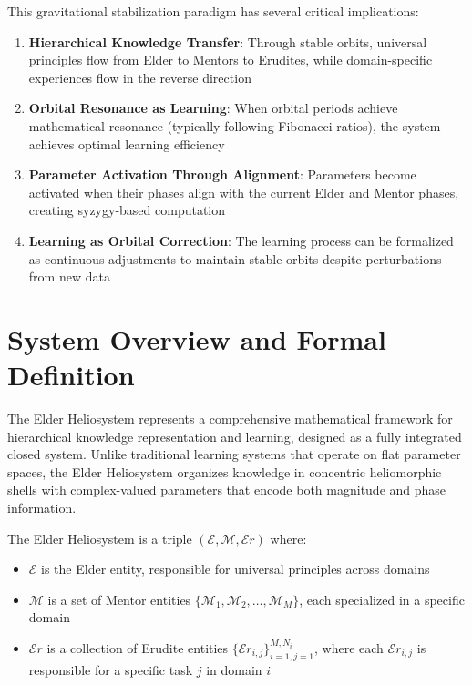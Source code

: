 This gravitational stabilization paradigm has several critical implications:

\begin{enumerate}
    \item \textbf{Hierarchical Knowledge Transfer}: Through stable orbits, universal principles flow from Elder to Mentors to Erudites, while domain-specific experiences flow in the reverse direction
    
    \item \textbf{Orbital Resonance as Learning}: When orbital periods achieve mathematical resonance (typically following Fibonacci ratios), the system achieves optimal learning efficiency
    
    \item \textbf{Parameter Activation Through Alignment}: Parameters become activated when their phases align with the current Elder and Mentor phases, creating syzygy-based computation
    
    \item \textbf{Learning as Orbital Correction}: The learning process can be formalized as continuous adjustments to maintain stable orbits despite perturbations from new data
\end{enumerate}

\section{System Overview and Formal Definition}

The Elder Heliosystem represents a comprehensive mathematical framework for hierarchical knowledge representation and learning, designed as a fully integrated closed system. Unlike traditional learning systems that operate on flat parameter spaces, the Elder Heliosystem organizes knowledge in concentric heliomorphic shells with complex-valued parameters that encode both magnitude and phase information.

\begin{definition}
The Elder Heliosystem is a triple $(\mathcal{E}, \mathcal{M}, \mathcal{E}r)$ where:
\begin{itemize}
    \item $\mathcal{E}$ is the Elder entity, responsible for universal principles across domains
    \item $\mathcal{M}$ is a set of Mentor entities $\{\mathcal{M}_1, \mathcal{M}_2, \ldots, \mathcal{M}_M\}$, each specialized in a specific domain
    \item $\mathcal{E}r$ is a collection of Erudite entities $\{\mathcal{E}r_{i,j}\}_{i=1,j=1}^{M,N_i}$, where each $\mathcal{E}r_{i,j}$ is responsible for a specific task $j$ in domain $i$
\end{itemize}
\end{definition}

